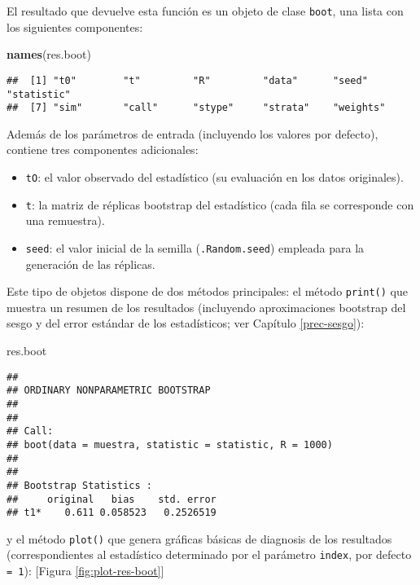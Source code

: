 \documentclass[]{book}
\newenvironment{Shaded}{\begin{snugshade}}{\end{snugshade}}
\newcommand{\KeywordTok}[1]{\textcolor[rgb]{0.13,0.29,0.53}{\textbf{#1}}}
\newcommand{\NormalTok}[1]{#1}
\theoremstyle{break}
\theoremstyle{definition}
\theoremstyle{definition}
\theoremstyle{definition}
\theoremstyle{remark}
\begin{document}
El resultado que devuelve esta función es un objeto de clase
\texttt{boot}, una lista con los siguientes componentes:

\begin{Shaded}
\begin{Highlighting}[]
\KeywordTok{names}\NormalTok{(res.boot)}
\end{Highlighting}
\end{Shaded}

\begin{verbatim}
##  [1] "t0"        "t"         "R"         "data"      "seed"      "statistic"
##  [7] "sim"       "call"      "stype"     "strata"    "weights"
\end{verbatim}

Además de los parámetros de entrada (incluyendo los valores por
defecto), contiene tres componentes adicionales:

\begin{itemize}
\item
  \texttt{tO}: el valor observado del estadístico (su evaluación en los
  datos originales).
\item
  \texttt{t}: la matriz de réplicas bootstrap del estadístico (cada fila
  se corresponde con una remuestra).
\item
  \texttt{seed}: el valor inicial de la semilla (\texttt{.Random.seed})
  empleada para la generación de las réplicas.
\end{itemize}

Este tipo de objetos dispone de dos métodos principales: el método
\texttt{print()} que muestra un resumen de los resultados (incluyendo
aproximaciones bootstrap del sesgo y del error estándar de los
estadísticos; ver Capítulo \ref{prec-sesgo}):

\begin{Shaded}
\begin{Highlighting}[]
\NormalTok{res.boot}
\end{Highlighting}
\end{Shaded}

\begin{verbatim}
## 
## ORDINARY NONPARAMETRIC BOOTSTRAP
## 
## 
## Call:
## boot(data = muestra, statistic = statistic, R = 1000)
## 
## 
## Bootstrap Statistics :
##     original   bias    std. error
## t1*    0.611 0.058523   0.2526519
\end{verbatim}

y el método \texttt{plot()} que genera gráficas básicas de diagnosis de
los resultados (correspondientes al estadístico determinado por el
parámetro \texttt{index}, por defecto \texttt{=\ 1}): {[}Figura
\ref{fig:plot-res-boot}{]}
\end{document}
